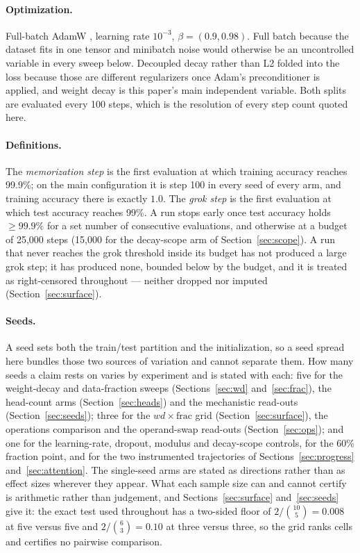 \documentclass[11pt]{article}
\begin{document}
\paragraph{Optimization.} Full-batch AdamW \citep{loshchilov2019adamw}, learning
rate $10^{-3}$, $\beta = (0.9, 0.98)$. Full batch because the dataset fits in
one tensor and minibatch noise would otherwise be an uncontrolled variable in
every sweep below. Decoupled decay rather than L2 folded into the loss because
those are different regularizers once Adam's preconditioner is applied, and
weight decay is this paper's main independent variable. Both splits are
evaluated every 100 steps, which is the resolution of every step count quoted
here.

\paragraph{Definitions.} The \emph{memorization step} is the first evaluation
at which training accuracy reaches 99.9\%; on the main configuration it is step
100 in every seed of every arm, and training accuracy there is exactly $1.0$.
The \emph{grok step} is the first evaluation at which test accuracy reaches
99\%. A run stops early once test accuracy holds $\ge 99.9\%$ for a set number
of consecutive evaluations, and otherwise at a budget of 25{,}000 steps
(15{,}000 for the decay-scope arm of Section~\ref{sec:scope}). A run that never
reaches the grok threshold inside its budget has not produced a large grok
step; it has produced none, bounded below by the budget, and it is treated as
right-censored throughout --- neither dropped nor imputed
(Section~\ref{sec:surface}).

\paragraph{Seeds.} A seed sets both the train/test partition and the
initialization, so a seed spread here bundles those two sources of variation
and cannot separate them. How many seeds a claim rests on varies by experiment
and is stated with each: five for the weight-decay and data-fraction sweeps
(Sections~\ref{sec:wd} and~\ref{sec:frac}), the head-count arms
(Section~\ref{sec:heads}) and the mechanistic read-outs
(Section~\ref{sec:seeds}); three for the $wd \times \mathrm{frac}$ grid
(Section~\ref{sec:surface}), the operations comparison and the operand-swap
read-outs (Section~\ref{sec:ops}); and one for the learning-rate, dropout,
modulus and decay-scope controls, for the 60\% fraction point, and for the two
instrumented trajectories of Sections~\ref{sec:progress}
and~\ref{sec:attention}. The single-seed arms are stated as directions rather
than as effect sizes wherever they appear. What each sample size can and cannot
certify is arithmetic rather than judgement, and
Sections~\ref{sec:surface} and~\ref{sec:seeds} give it: the exact test used
throughout has a two-sided floor of $2/\binom{10}{5} = 0.008$ at five versus
five and $2/\binom{6}{3} = 0.10$ at three versus three, so the grid ranks cells
and certifies no pairwise comparison.
\end{document}
